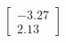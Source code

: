 \documentclass[preview]{standalone}
\begin{document}
\begin{align*}
\begin{bmatrix} -3.27 \\ 2.13 \end{bmatrix}
\end{align*}
\end{document}
